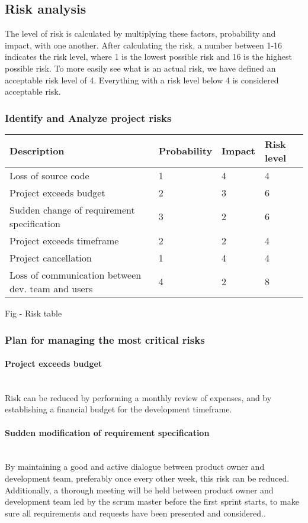 \subsection{Risk analysis}

The level of risk is calculated by multiplying these factors, probability and impact, with one another. After calculating the risk, a number between 1-16 indicates the risk level, where 1 is the lowest possible risk and 16 is the highest possible risk. To more easily see what is an actual risk, we have defined an acceptable risk level of 4. Everything with a risk level below 4 is considered acceptable risk.

\subsubsection{Identify and Analyze project risks}
\begin{tabular}{|l|l|l|l|}
\hline
	Description 							& Probability & Impact 	& Risk level \\
\hline Loss of source code 						& 1		& 4 		& \cellcolor{green} 4 \\
\hline Project exceeds budget 					& 2 		& 3		& \cellcolor{orange} 6 \\
\hline Sudden change of requirement specification 		& 3 		& 2 		& \cellcolor{orange} 6 \\
\hline Project exceeds timeframe 				& 2 		& 2 		& \cellcolor{green} 4 \\
\hline Project cancellation 						& 1 		& 4		& \cellcolor{green} 4 \\
\hline Loss of communication between dev. team and users 	& 4 		& 2 		& \cellcolor{red} 8 \\
\hline
\end{tabular}
Fig - Risk table

\subsubsection{Plan for managing the most critical risks}

\paragraph{Project exceeds budget}~\\
Risk can be reduced by performing a monthly review of expenses, and by establishing a financial budget for the development timeframe.

\paragraph{Sudden modification of requirement specification}~\\
By maintaining a good and active dialogue between product owner and development team, preferably once every other week, this risk can be reduced.
Additionally, a thorough meeting will be held between product owner and development team led by the scrum master before the first sprint starts, to make sure all requirements and requests have been presented and considered..

